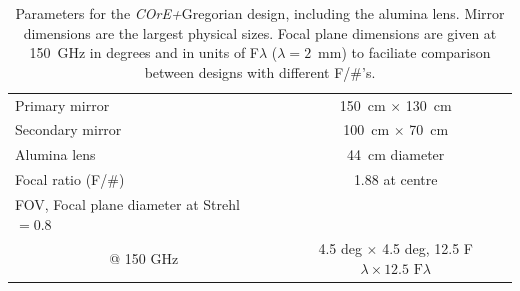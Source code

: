 \documentclass[11pt,a4paper]{article}
\newcommand{\coreplus}{\textit{\negthinspace COrE+\/}}
\begin{document}
\begin{table}[h!]
	\centering
	\begin{tabular}{|l|c|}
		\hline
		Primary mirror   & 150~cm $\times$ 130~cm   \\
		Secondary mirror   & 100~cm $\times$ 70~cm  \\
		Alumina lens	& 44~cm diameter \\
		Focal ratio (F/\#)               & 1.88 at centre   \\
		\multicolumn{1}{|l|}{FOV, Focal plane diameter at Strehl $= 0.8$} & \\
		\multicolumn{1}{|c|}{@ 150 GHz}    & 4.5 deg $\times$ 4.5 deg, 12.5 F$\lambda \times 12.5 \text{~F}\lambda$ \\
		\hline
		
	\end{tabular}
	\caption{Parameters for the \coreplus Gregorian design, including the alumina lens.  Mirror dimensions are the largest physical sizes.  Focal plane dimensions are given at 150~GHz in degrees and in units of F$\lambda$ ($\lambda=2$~mm) to faciliate comparison between 
		designs with different F/\#'s. }
	\label{tab:mirrors_greg}
\end{table}
\end{document}
